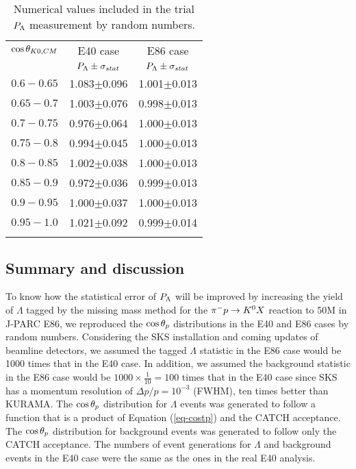 
\begin{table}[!h] 
  \begin{center}
  \caption{Numerical values included in the trial $P_{\Lambda}$ measurement by random numbers.}
    \begin{tabular}{ccc}
    $\cos{\theta_{K0,CM}}$ & E40 case & E86 case  \\
     & $P_{\Lambda}\pm\sigma_{stat}$ & $P_{\Lambda}\pm\sigma_{stat}$ \\
    \midrule\midrule
    $0.6-0.65$ & 1.083$\pm$0.096 & 1.001$\pm$0.013  \\
    \midrule
    $0.65-0.7$ & 1.003$\pm$0.076 & 0.998$\pm$0.013 \\
    \midrule
    $0.7-0.75$ & 0.976$\pm$0.064 & 1.000$\pm$0.013 \\
    \midrule
    $0.75-0.8$ & 0.994$\pm$0.045 & 1.000$\pm$0.013 \\
    \midrule
    $0.8-0.85$ & 1.002$\pm$0.038 & 1.000$\pm$0.013 \\
    \midrule
    $0.85-0.9$ & 0.972$\pm$0.036 & 0.999$\pm$0.013 \\
    \midrule
    $0.9-0.95$ & 1.000$\pm$0.037 & 1.000$\pm$0.013 \\
    \midrule 
    $0.95-1.0$ & 1.021$\pm$0.092 & 0.999$\pm$0.014 \\
    \label{tab-randPl}
    \end{tabular}
  \end{center}
\end{table}


\subsection{Summary and discussion}
To know how the statistical error of $P_{\Lambda}$ will be improved by increasing the yield of $\Lambda$ tagged by the missing mass method for the $\pi^- p \to K^0 X$ reaction to 50M in J-PARC E86, we reproduced the $\cos{\theta_p}$ distributions in the E40 and E86 cases by random numbers. Considering the SKS installation and coming updates of beamline detectors, we assumed the tagged $\Lambda$ statistic in the E86 case would be 1000 times that in the E40 case. In addition, we assumed the background statistic in the E86 case would be $1000\times\frac{1}{10}=100$ times that in the E40 case since SKS has a momentum resolution of $\Delta p/p = 10^{-3}$ (FWHM), ten times better than KURAMA. The $\cos{\theta_p}$ distribution for $\Lambda$ events was generated to follow a function that is a product of Equation (\ref{eq-costp}) and the CATCH acceptance. The $\cos{\theta_p}$ distribution for background events was generated to follow only the CATCH acceptance. The numbers of event generations for $\Lambda$ and background events in the E40 case were the same as the ones in the real E40 analysis. 

